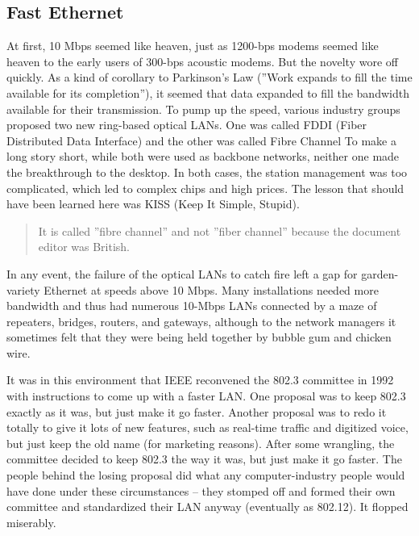 \documentclass[b5paper,11pt]{memoir}
\begin{document}
\subsection{Fast Ethernet}

At first, 10 Mbps seemed like heaven, just as 1200-bps modems seemed
like heaven to the early users of 300-bps acoustic modems. But the
novelty wore off quickly. As a kind of corollary to Parkinson's Law
(''Work expands to fill the time available for its completion''), it
seemed that data expanded to fill the bandwidth available for their
transmission. To pump up the speed, various industry groups proposed two
new ring-based optical LANs. One was called {FDDI} ({Fiber Distributed
Data Interface}) and the other was called {Fibre Channel}
To make a long story short, while both were used as backbone networks,
neither one made the breakthrough to the desktop. In both cases, the
station management was too complicated, which led to complex chips and
high prices. The lesson that should have been learned here was KISS
(Keep It Simple, Stupid).

\begin{quote}
It is called ''fibre channel'' and not ''fiber channel'' because the
document editor was British.
\end{quote}

In any event, the failure of the optical LANs to catch fire left a gap
for garden-variety Ethernet at speeds above 10 Mbps. Many installations
needed more bandwidth and thus had numerous 10-Mbps LANs connected by a
maze of repeaters, bridges, routers, and gateways, although to the
network managers it sometimes felt that they were being held together by
bubble gum and chicken wire.

It was in this environment that IEEE reconvened the 802.3 committee in
1992 with instructions to come up with a faster LAN. One proposal was to
keep 802.3 exactly as it was, but just make it go faster. Another
proposal was to redo it totally to give it lots of new features, such as
real-time traffic and digitized voice, but just keep the old name (for
marketing reasons). After some wrangling, the committee decided to keep
802.3 the way it was, but just make it go faster. The people behind the
losing proposal did what any computer-industry people would have done
under these circumstances -- they stomped off and formed their own
committee and standardized their LAN anyway (eventually as 802.12). It
flopped miserably.
\end{document}
